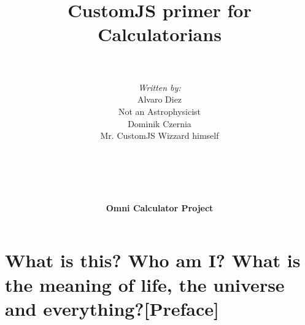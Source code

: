 \documentclass[11pt,a4paper,oldfontcommands]{memoir}
\begin{document}
%
%
\thispagestyle{empty}

{%

\centering
\title{ \normalsize \textsc{}
		\\ [2.0cm]
		\hline \vspace{10pt} \\
		\huge \textbf{CustomJS primer for Calculatorians\textsuperscript{\textregistered}} \vspace{5pt}
		\textbf{\hline}{\hline} \\ [0.5cm]
		\large \vspace{200pt}\\}		}
		


\author{{\textit{Written by:}}\\
        \LARGE Alvaro Diez \\
		Not an Astrophysicist\texttrademark \\ 
		\LARGE Dominik Czernia \\
		Mr. CustomJS Wizzard himself \\ \\
	\\ \\ \\ \\
		\LARGE {\textbf{Omni Calculator Project}} \vspace{-50pt}
} 

\maketitle
\noalign
\clearpage

\tableofcontents

\clearpage


\chapter{What is this? Who am I? What is the meaning of life, the universe and everything?[Preface]}
\end{document}
